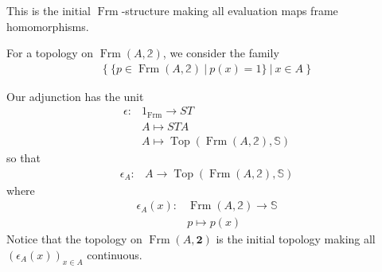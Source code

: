 \documentclass[12pt,a4paper]{article}
\DeclareMathOperator{\Frm}{Frm}
\DeclareMathOperator{\Top}{Top}
\begin{document}
This is the initial $\Frm$-structure making all evaluation maps frame homomorphisms.




For a topology on $\Frm(A, \mathbb{2})$, we consider the family \begin{align*}
	\{ \  \{p \in \Frm(A, \mathbb{2}) \   \lvert \  p(x) = 1 \} \ \lvert \ x \in A \ \} 
\end{align*} 

Our adjunction has the unit
\begin{align*}
	\epsilon:& 1_{\Frm} \to ST\\
	&A \mapsto STA\\
	&A \mapsto \Top(\Frm(A, \mathbb{2}), \mathbb{S})
\end{align*}
so that 
\begin{align*}
	\epsilon_A:& A \to \Top(\Frm(A, \mathbb{2}), \mathbb{S})
\end{align*}
where 
\begin{align*}
	\epsilon_A(x):& \Frm(A, \mathbb{2}) \to \mathbb{S}\\
	&p \mapsto p(x)
\end{align*}
Notice that the topology on $\Frm(A, \mathbf{2})$ is the initial topology making all $(\epsilon_A(x))_{x \in A}$ continuous.
\end{document}
